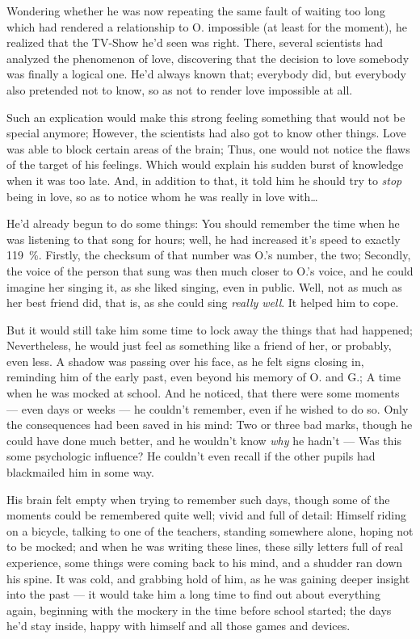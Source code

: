 Wondering whether he was now repeating the same fault of waiting too long which had rendered a relationship to O. impossible (at least for the moment), he realized that the TV-Show he'd seen was right. 
There, several scientists had analyzed the phenomenon of love, discovering that the decision to love somebody was finally a logical one. 
He'd always known that; everybody did, but everybody also pretended not to know, so as not to render love impossible at all.

Such an explication would make this strong feeling something that would not be special anymore; However, the scientists had also got to know other things. Love was able to block certain areas of the brain; Thus, one would not notice the flaws of the target of his feelings. 
Which would explain his sudden burst of knowledge when it was too late. And, in addition to that, it told him he should try to \emph{stop} being in love, so as to notice whom he was really in love with\dots{}

He'd already begun to do some things: You should remember the time when he was listening to that song for hours; well, he had increased it's speed to exactly \SI{119}{\percent}. Firstly, the checksum of that number was O.'s number, the two; Secondly, the voice of the person that sung was then much closer to O.'s voice, and he could imagine her singing it, as she liked singing, even in public. Well, not as much as her best friend did, that is, as she could sing \emph{really well}. 
It helped him to cope.

But it would still take him some time to lock away the things that had happened; Nevertheless, he would just feel as something like a friend of her, or probably, even less. 
A shadow was passing over his face, as he felt signs closing in, reminding him of the early past, even beyond his memory of O. and G.; A time when he was mocked at school. 
And he noticed, that there were some moments --- even days or weeks --- he couldn't remember, even if he wished to do so. Only the consequences had been saved in his mind: Two or three bad marks, though he could have done much better, and he wouldn't know \emph{why} he hadn't --- Was this some psychologic influence? He couldn't even recall if the other pupils had blackmailed him in some way.

His brain felt empty when trying to remember such days, though some of the moments could be remembered quite well; vivid and full of detail: Himself riding on a bicycle, talking to one of the teachers, standing somewhere alone, hoping not to be mocked; and when he was writing these lines, these silly letters full of real experience, some things were coming back to his mind, and a shudder ran down his spine. 
It was cold, and grabbing hold of him, as he was gaining deeper insight into the past --- it would take him a long time to find out about everything again, beginning with the mockery in the time before school started; the days he'd stay inside, happy with himself and all those games and devices.

